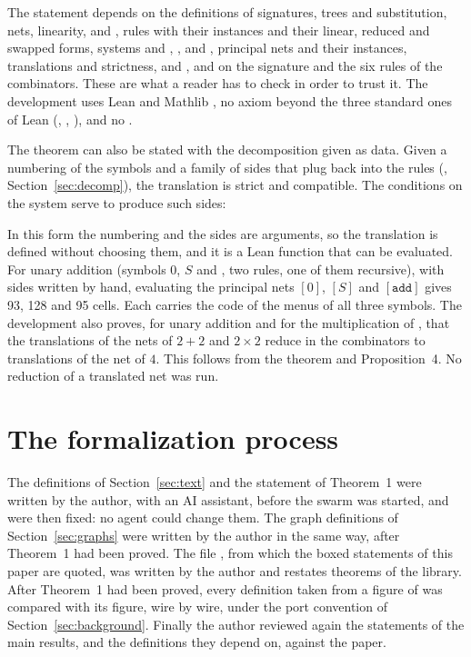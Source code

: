 \documentclass[11pt,a4paper]{article}
\newcommand{\lean}[1]{%
  \VerbatimInput[frame=single,rulecolor=\color{codeframe},framesep=1.6mm,breaklines=true,
    breakanywhere=false,breaksymbolleft={},samepage=true,fontsize=\fontsize{7.4}{9.0}\selectfont]{snip/#1.lean}}
\newcommand{\Equiv}{\cod{Equiv}}
\newcommand{\pp}[1]{\cite[#1]{lafont1997}}
\begin{document}
The statement depends on the definitions of signatures, trees and substitution, nets,
linearity,  and \Equiv{}, rules with their instances and their linear, reduced and
swapped forms, systems and , ,  and ,
principal nets and their instances, translations and strictness,  and
, and on the signature and the six rules of the combinators.
These are what a reader has to check in order to trust it. The development uses Lean
 and Mathlib , no axiom beyond the three standard ones of Lean
(, , ), and no .

The theorem can also be stated with the decomposition given as data. Given a numbering of the
symbols and a family of sides that plug back into the rules (,
Section~\ref{sec:decomp}), the translation is strict and compatible. The conditions on the
system serve to produce such sides:

\lean{thm1_explicit}

In this form the numbering and the sides are arguments, so the translation is defined without
choosing them, and it is a Lean function that can be evaluated. For unary addition (symbols $0$, $S$ and , two rules, one of
them recursive), with sides written by hand, evaluating the principal nets $[0]$, $[S]$ and
$[\mathtt{add}]$ gives 93, 128 and 95 cells. Each carries the code of the menus of all three
symbols. The development also proves, for unary addition and for the multiplication of
\pp{Section~1.5}, that the translations of the nets of $2 + 2$ and $2 \times 2$ reduce in the
combinators to translations of the net of $4$. This follows from the theorem and
Proposition~4. No reduction of a translated net was run.

\section{The formalization process}
\label{sec:method}

The definitions of Section~\ref{sec:text} and the statement of Theorem~1 were written by the
author, with an AI assistant, before the swarm was started, and were then fixed: no agent could
change them. The graph definitions of Section~\ref{sec:graphs} were written by the author in the
same way, after Theorem~1 had been proved. The file , from which the boxed statements of this
paper are quoted, was written by the author and restates theorems of the library. After Theorem~1 had been proved, every definition taken from a
figure of \pp{Sections~2.1 to~2.7} was compared with its figure, wire by wire, under the port
convention of Section~\ref{sec:background}. Finally the author reviewed again the statements of
the main results, and the definitions they depend on, against the paper.
\end{document}
